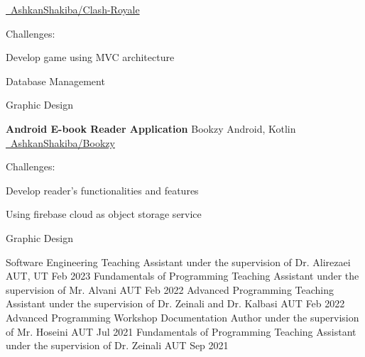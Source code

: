 \documentclass[]{awesome-cv}
\begin{document}
\begin{cventries}
	{\href{https://github.com/AshkanShakiba/Clash-Royale}{\faGithub\ AshkanShakiba/Clash-Royale}}
	{\begin{cvitems}
		\vspace{1mm}
		\item[] {\hspace{-9mm} Challenges:}
		\vspace{1mm}
		\item {Develop game using MVC architecture}
		\vspace{1mm}
		\item {Database Management}
		\vspace{1mm}
		\item {Graphic Design}
	\end{cvitems}}
	\vspace{0mm}
	\cventry
	{\textbf{Android E-book Reader Application}}
	{Bookzy}
	{Android, Kotlin}
	{\href{https://github.com/maryam-kermanshahani2001/Bookzy}{\faGithub\ AshkanShakiba/Bookzy}}
	{\begin{cvitems}
		\vspace{1mm}
		\item[] {\hspace{-9mm} Challenges:}
		\vspace{1mm}
		\item {Develop reader's functionalities and features}
		\vspace{1mm}
		\item {Using firebase cloud as object storage service}
		\vspace{1mm}
		\item {Graphic Design}
	\end{cvitems}}
	\vspace{-3mm}
\end{cventries}
\vspace{2mm}
\begin{cvhonors}
	\cvhonor
	{Software Engineering}
	{Teaching Assistant under the supervision of Dr. Alirezaei}
	{AUT, UT}
	{Feb 2023}
	\cvhonor
	{Fundamentals of Programming}
	{Teaching Assistant under the supervision of Mr. Alvani}
	{AUT}
	{Feb 2022}
	\cvhonor
	{Advanced Programming}
	{Teaching Assistant under the supervision of Dr. Zeinali and Dr. Kalbasi}
	{AUT}
	{Feb 2022}
	\cvhonor
	{Advanced Programming}
	{Workshop Documentation Author under the supervision of Mr. Hoseini}
	{AUT}
	{Jul 2021}
	\cvhonor
	{Fundamentals of Programming}
	{Teaching Assistant under the supervision of Dr. Zeinali}
	{AUT}
	{Sep 2021}
\end{cvhonors}
\end{document}
